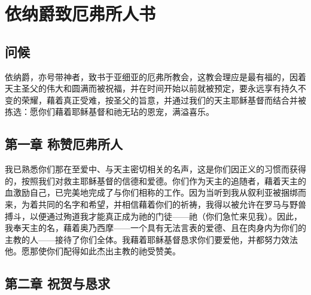 
\chapter{依纳爵致厄弗所人书}



\section{问候}

依纳爵，亦号带神者，致书于亚细亚的厄弗所教会，这教会理应是最有福的，因着天主圣父的伟大和圆满而被祝福，并在时间开始以前就被预定，要永远享有持久不变的荣耀，藉着真正受难，按圣父的旨意，并通过我们的天主耶稣基督而结合并被拣选：愿你们藉着耶稣基督和祂无玷的恩宠，满溢喜乐。\par


\section{第一章 称赞厄弗所人}

我已熟悉你们那在至爱中、与天主密切相关的名声，这是你们因正义的习惯而获得的，按照我们对救主耶稣基督的信德和爱德。你们作为天主的追随者，藉着天主的血激励自己，已完美地完成了与你们相称的工作。因为当听到我从叙利亚被捆绑而来，为着共同的名字和希望，并相信藉着你们的祈祷，我得以被允许在罗马与野兽搏斗，以便通过殉道我才能真正成为祂的门徒——祂（你们急忙来见我）。因此，我奉天主的名，藉着奥乃西摩——一个具有无法言表的爱德、且在肉身内为你们的主教的人——接待了你们全体。我藉着耶稣基督恳求你们要爱他，并都努力效法他。愿那使你们配得如此杰出主教的祂受赞美。\par


\section{第二章 祝贺与恳求}

